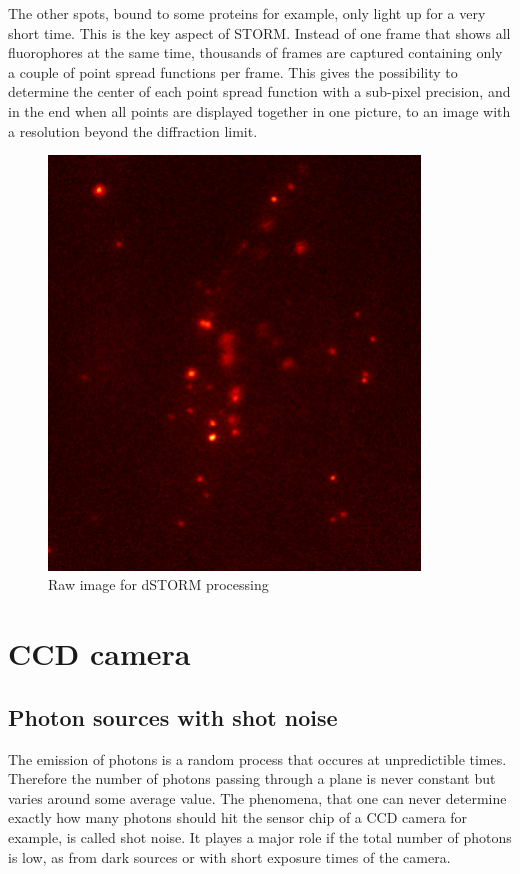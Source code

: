 The other spots, bound to some proteins for example, only light up for a very short time. This is the key aspect of STORM. Instead of one frame that shows all fluorophores at the same time, thousands of frames are captured containing only a couple of point spread functions per frame. This gives the possibility to determine the center of each point spread function with a sub-pixel precision, and in the end when all points are displayed together in one picture, to an image with a resolution beyond the diffraction limit.

\begin{figure}
\centering
\includegraphics[width = 0.88\textwidth]{pictures/Pos2_2_red2-2frame2475Color.png}
	\caption{Raw image for dSTORM processing}
	\label{rawStorm}
\end{figure}

\section{CCD camera}
\subsection{Photon sources with shot noise}
The emission of photons is a random process that occures at unpredictible times. Therefore the number of photons passing through a plane is never constant but varies around some average value. The phenomena, that one can never determine exactly how many photons should hit the sensor chip of a CCD camera for example, is called shot noise. It playes a major role if the total number of photons is low, as from dark sources or with short exposure times of the camera.
